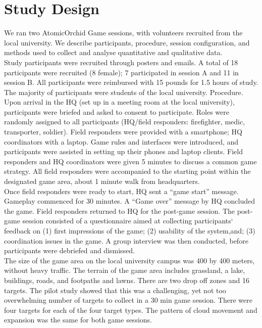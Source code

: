 \section{Study Design}
We ran two AtomicOrchid Game sessions, with volunteers recruited from the local university. We describe participants, procedure, session configuration, and methods used to collect and analyse quantitative and qualitative data.\\

Study participants were recruited through posters and emails. A total of 18 participants were recruited (8 female); 7 participated in session A and 11 in session B. All participants were reimbursed with 15 pounds for 1.5 hours of study. The majority of participants were students of the local university. Procedure. Upon arrival in the HQ (set up in a meeting room at the local university), participants were briefed and asked to consent to participate. Roles were randomly assigned to all participants (HQ/field responders: firefighter, medic, transporter, soldier). Field responders were provided with a smartphone; HQ coordinators with a laptop. Game rules and interfaces were introduced, and participants were assisted in setting up their phones and laptop clients. Field responders and HQ coordinators were given 5 minutes to discuss a common game strategy. All field responders were accompanied to the starting point within the designated game area, about 1 minute walk from headquarters.\\

Once field responders were ready to start, HQ sent a ``game start'' message. Gameplay commenced for 30 minutes. A ``Game over'' message by HQ concluded the game. Field responders returned to HQ for the post-game session. The post-game session consisted of a questionnaire aimed at collecting participants` feedback on (1) first impressions of the game; (2) usability of the system,and; (3) coordination issues in the game. A group interview was then conducted, before participants were debriefed and dismissed.\\

The size of the game area on the local university campus was 400 by 400 meters, without heavy traffic. The terrain of the game area includes grassland, a lake, buildings, roads, and footpaths and lawns. There are two drop off zones and 16 targets. The pilot study showed that this was a challenging, yet not too overwhelming number of targets to collect in a 30 min game session. There were four targets for each of the four target types. The pattern of cloud movement and expansion was the same for both game sessions.\\

